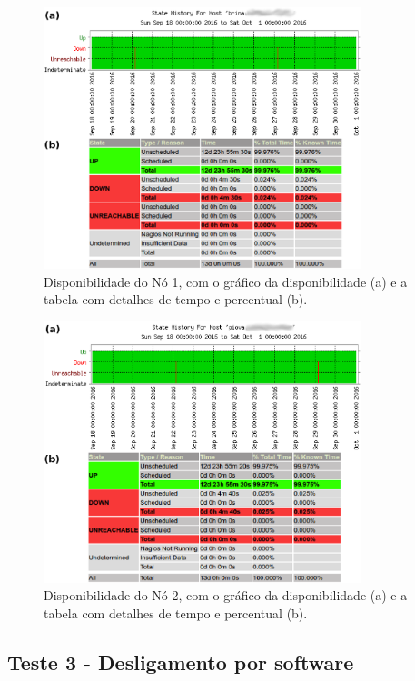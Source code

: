 \begin{figure}[h!]
 \centering
 \includegraphics[width=350px]{img/teste2_brina1.eps}
 \caption{Disponibilidade do Nó 1, com o gráfico da disponibilidade (a) e a tabela com detalhes de tempo e percentual (b).}
 \label{fig:teste2_brina1}
\end{figure}

\begin{figure}[h!]
 \centering
 \includegraphics[width=350px]{img/teste2_piova1.eps}
 \caption{Disponibilidade do Nó 2, com o gráfico da disponibilidade (a) e a tabela com detalhes de tempo e percentual (b).}
 \label{fig:teste2_piova1}
\end{figure}




\subsection{Teste 3 - Desligamento por software}

